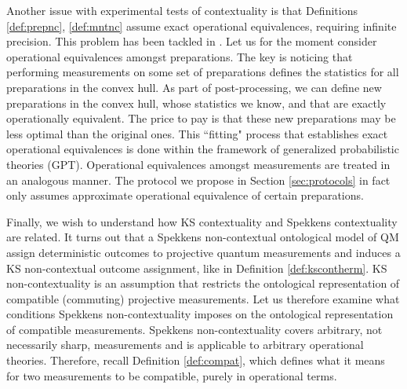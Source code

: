 Another issue with experimental tests of contextuality is that Definitions \ref{def:prepnc}, \ref{def:mntnc} assume exact operational equivalences, requiring infinite precision. This problem has been tackled in \cite{Pusey2018,Mazurek2016}. Let us for the moment consider operational equivalences amongst preparations. The key is noticing that performing measurements on some set of preparations defines the statistics for all preparations in the convex hull. As part of post-processing, we can define new preparations in the convex hull, whose statistics we know, and that are exactly operationally equivalent. The price to pay is that these new preparations may be less optimal than the original ones. This ``fitting" process that establishes exact operational equivalences is done within the framework of generalized probabilistic theories (GPT). Operational equivalences amongst measurements are treated in an analogous manner. The protocol we propose in Section \ref{sec:protocols} in fact only assumes approximate operational equivalence of certain preparations.

Finally, we wish to understand how KS contextuality and Spekkens contextuality are related. It turns out that a Spekkens non-contextual ontological model of QM assign deterministic outcomes to projective quantum measurements and induces a KS non-contextual outcome assignment, like in Definition \ref{def:kscontherm}.
KS non-contextuality is an assumption that restricts the ontological representation of compatible (commuting) projective measurements. Let us therefore examine what conditions Spekkens non-contextuality imposes on the ontological representation of compatible measurements. Spekkens non-contextuality covers arbitrary, not necessarily sharp, measurements and is applicable to arbitrary operational theories. Therefore, recall Definition \ref{def:compat}, which defines what it means for two measurements to be compatible, purely in operational terms.

